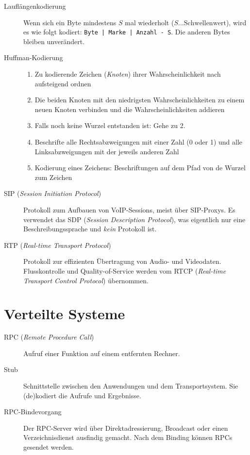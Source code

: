 \documentclass[a4paper]{article}
\begin{document}
\begin{description}
    \item[Lauflängenkodierung] Wenn sich ein Byte mindestens $S$ mal wiederholt ($S \ldots \text{Schwellenwert}$), wird es wie folgt kodiert: \texttt{Byte | Marke | Anzahl - S}. Die anderen Bytes bleiben unverändert.
    \item[Huffman-Kodierung] \hfill
    \begin{samepage}
    \begin{enumerate}
        \item Zu kodierende Zeichen (\textit{Knoten}) ihrer Wahrscheinlichkeit nach aufsteigend ordnen
        \item Die beiden Knoten mit den niedrigsten Wahrscheinlichkeiten zu einem neuen Knoten verbinden und die Wahrscheinlichkeiten addieren
        \item Falls noch keine Wurzel entstanden ist: Gehe zu 2.
        \item Beschrifte alle Rechtsabzweigungen mit einer Zahl (0 oder 1) und alle Linksabzweigungen mit der jeweils anderen Zahl
        \item Kodierung eines Zeichens: Beschriftungen auf dem Pfad von de Wurzel zum Zeichen
    \end{enumerate}
    \end{samepage}
    \item[SIP (\textit{Session Initiation Protocol})] Protokoll zum Aufbauen von VoIP-Sessions, meist über SIP-Proxys. Es verwendet das SDP (\textit{Session Description Protocol}), was eigentlich nur eine Beschreibungssprache und \textit{kein} Protokoll ist.
    \item[RTP (\textit{Real-time Transport Protocol})] Protokoll zur effizienten Übertragung von Audio- und Videodaten. Flusskontrolle und Quality-of-Service werden vom RTCP (\textit{Real-time Transport Control Protocol}) übernommen.
\end{description}

\section{Verteilte Systeme}

\begin{description}
    \item[RPC (\textit{Remote Procedure Call})] Aufruf einer Funktion auf einem entfernten Rechner.
    \item[Stub] Schnittstelle zwischen den Anwendungen und dem Transportsystem. Sie (de)kodiert die Aufrufe und Ergebnisse.
    \item[RPC-Bindevorgang] Der RPC-Server wird über Direktadressierung, Broadcast oder einen Verzeichnisdienst ausfindig gemacht. Nach dem Binding können RPCs gesendet werden.
\end{description}
\end{document}
